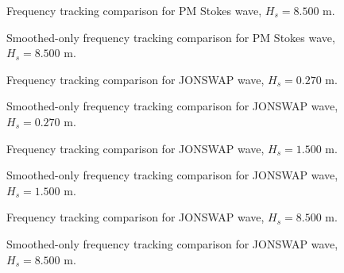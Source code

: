 \documentclass[11pt,letterpaper]{article}
\begin{document}
\begin{figure}[H]\centering
  \resizebox{\textwidth}{!}{}
  \caption{Frequency tracking comparison for PM Stokes wave, $H_s = 8.500$ m.}
  \label{fig:freqtrack_pmstokes_high}
\end{figure}
\begin{figure}[H]\centering
  \resizebox{\textwidth}{!}{}
  \caption{Smoothed-only frequency tracking comparison for PM Stokes wave, $H_s = 8.500$ m.}
  \label{fig:freqtrack_pmstokes_high_smooth}
\end{figure}

\begin{figure}[H]\centering
  \resizebox{\textwidth}{!}{}
  \caption{Frequency tracking comparison for JONSWAP wave, $H_s = 0.270$ m.}
  \label{fig:freqtrack_jonswap_low}
\end{figure}
\begin{figure}[H]\centering
  \resizebox{\textwidth}{!}{}
  \caption{Smoothed-only frequency tracking comparison for JONSWAP wave, $H_s = 0.270$ m.}
  \label{fig:freqtrack_jonswap_low_smooth}
\end{figure}

\begin{figure}[H]\centering
  \resizebox{\textwidth}{!}{}
  \caption{Frequency tracking comparison for JONSWAP wave, $H_s = 1.500$ m.}
  \label{fig:freqtrack_jonswap_medium}
\end{figure}
\begin{figure}[H]\centering
  \resizebox{\textwidth}{!}{}
  \caption{Smoothed-only frequency tracking comparison for JONSWAP wave, $H_s = 1.500$ m.}
  \label{fig:freqtrack_jonswap_medium_smooth}
\end{figure}

\begin{figure}[H]\centering
  \resizebox{\textwidth}{!}{}
  \caption{Frequency tracking comparison for JONSWAP wave, $H_s = 8.500$ m.}
  \label{fig:freqtrack_jonswap_high}
\end{figure}
\begin{figure}[H]\centering
  \resizebox{\textwidth}{!}{}
  \caption{Smoothed-only frequency tracking comparison for JONSWAP wave, $H_s = 8.500$ m.}
  \label{fig:freqtrack_jonswap_high_smooth}
\end{figure}
\end{document}
